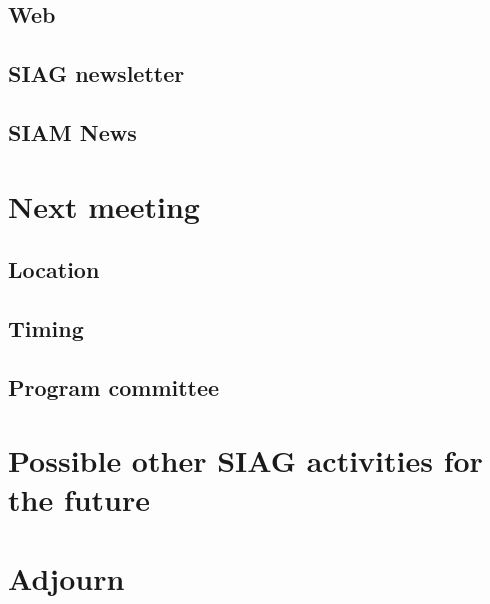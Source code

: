 \documentclass[]{article}
\begin{document}
\subsection{Web}
\subsection{SIAG newsletter}
\subsection{SIAM News}
\section{Next meeting}
\subsection{Location}
\subsection{Timing}
\subsection{Program committee}

\section{Possible other SIAG activities for the future}
\section{Adjourn}
\end{document}
